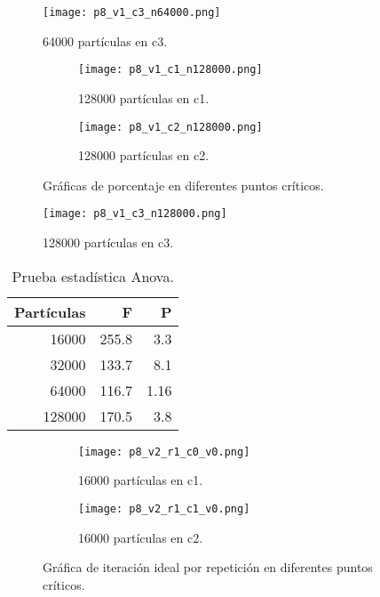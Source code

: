 \documentclass{article}
\begin{document}
\begin{figure}[H]
\centering
\texttt{[image: p8\_v1\_c3\_n64000.png]}
\caption{\label{fig3} 64000 partículas en c3.}
\end{figure}

\begin{figure}[H]
\centering
\begin{subfigure}[b]{0.40\linewidth}
\texttt{[image: p8\_v1\_c1\_n128000.png]}
\caption{128000 partículas en c1.}
\end{subfigure}
\begin{subfigure}[b]{0.40\linewidth}
\texttt{[image: p8\_v1\_c2\_n128000.png]}
\caption{128000 partículas en c2.}
\end{subfigure}
\caption{Gráficas de porcentaje en diferentes puntos críticos.}
\label{fig:westminster}
\end{figure}

\begin{figure}[H]
\centering
\texttt{[image: p8\_v1\_c3\_n128000.png]}
\caption{\label{fig3} 128000 partículas en c3.}
\end{figure}

\begin{table}[h!]
\centering
\caption{Prueba estadística Anova.}
 \begin{tabular}{||r r r||} 
 \hline
 Partículas & F & P  \\ [0.5ex] 
 \hline\hline
 16000 & 255.8 & 3.3 \\
 \hline
 32000 & 133.7 & 8.1\\ 
 \hline
 64000 & 116.7 & 1.16  \\
 \hline
 128000 & 170.5 & 3.8 \\
 \hline
\end{tabular}
\label{table:1}
\end{table}

\begin{figure}[H]
\centering
\begin{subfigure}[b]{0.40\linewidth}
\texttt{[image: p8\_v2\_r1\_c0\_v0.png]}
\caption{16000 partículas en c1.}
\end{subfigure}
\begin{subfigure}[b]{0.40\linewidth}
\texttt{[image: p8\_v2\_r1\_c1\_v0.png]}
\caption{16000 partículas en c2.}
\end{subfigure}
\caption{Gráfica de iteración ideal por repetición en diferentes puntos críticos.}
\label{fig:westminster}
\end{figure}
\end{document}
